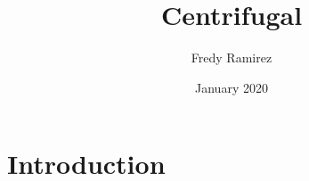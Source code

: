 \documentclass{article}
\title{Centrifugal}
\author{Fredy Ramirez}
\date{January 2020}
\begin{document}
\maketitle

\section{Introduction}
\end{document}
